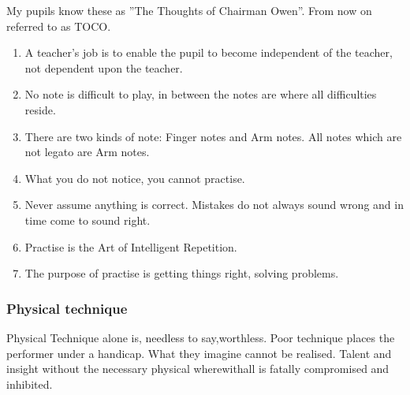 \documentclass{article}
\begin{document}
My pupils know these as ''The Thoughts of Chairman Owen''.
From now on referred to as TOCO.

\begin{enumerate}
    \item A teacher’s job is to enable the pupil to become independent of the teacher, not dependent upon the teacher.
    \item No note is difficult to play, in between the notes are where all difficulties reside.
    \item There are two kinds of note: Finger notes and Arm notes.
        All notes which are not legato are Arm notes.\footnotemark


    \item What you do not notice, you cannot practise.
    \item Never assume anything is correct.
        Mistakes do not always sound wrong and in time come to sound right.
    \item Practise is the Art of Intelligent Repetition.\footnotemark


    \item The purpose of practise is getting things right, solving problems.\footnotemark


\end{enumerate}

\subsubsection{Physical technique}

Physical Technique alone is, needless to say,worthless.\footnotemark
Poor technique places the performer under a handicap.
What they imagine cannot be realised.
Talent and insight without the necessary physical wherewithall is fatally compromised and inhibited.

\end{document}
